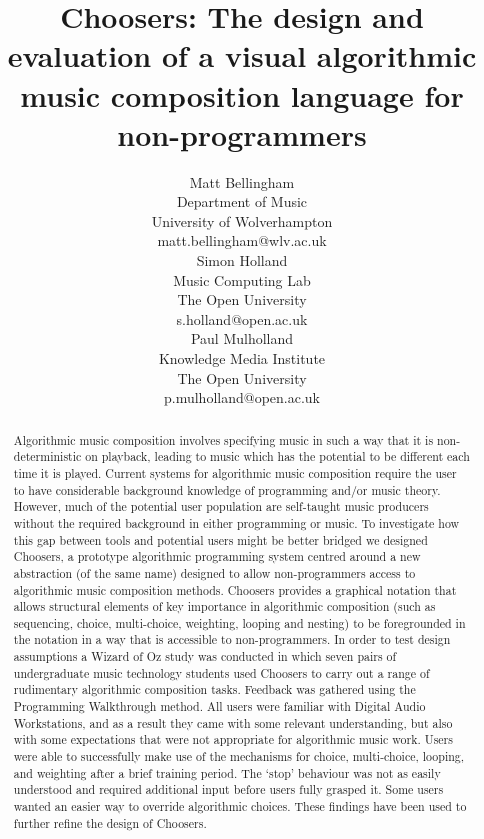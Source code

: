 \documentclass{ppig}
\title{Choosers: The design and evaluation of a visual algorithmic music
composition language for non-programmers}
\author{Matt Bellingham \\
  Department of Music \\
  University of Wolverhampton \\
  matt.bellingham@wlv.ac.uk \\
  \And
  Simon Holland \\
  Music Computing Lab \\
  The Open University \\
  s.holland@open.ac.uk \\
  \And
  Paul Mulholland\\
  Knowledge Media Institute \\
  The Open University \\
  p.mulholland@open.ac.uk}
\date{}
\begin{document}
\maketitle
\thispagestyle{empty}

\begin{abstract}
Algorithmic music composition involves specifying music in such a way that it is non-deterministic on playback, leading to music which has the potential to be different each time it is played. Current systems for algorithmic music composition require the user to have considerable background knowledge of programming and/or music theory. However, much of the potential user population are self-taught music producers without the required background in either programming or music. To investigate how this gap between tools and potential users might be better bridged we designed Choosers, a prototype algorithmic programming system centred around a new abstraction (of the same name) designed to allow non-programmers access to algorithmic music composition methods. Choosers provides a graphical notation that allows structural elements of key importance in algorithmic composition (such as sequencing, choice, multi-choice, weighting, looping and nesting) to be foregrounded in the notation in a way that is accessible to non-programmers. In order to test design assumptions a Wizard of Oz study was conducted in which seven pairs of undergraduate music technology students used Choosers to carry out a range of rudimentary algorithmic composition tasks. Feedback was gathered using the Programming Walkthrough method. All users were familiar with Digital Audio Workstations, and as a result they came with some relevant understanding, but also with some expectations that were not appropriate for algorithmic music work. Users were able to successfully make use of the mechanisms for choice, multi-choice, looping, and weighting after a brief training period. The `stop' behaviour was not as easily understood and required additional input before users fully grasped it. Some users wanted an easier way to override algorithmic choices. These findings have been used to further refine the design of Choosers.
\end{abstract}



 
\end{document}
